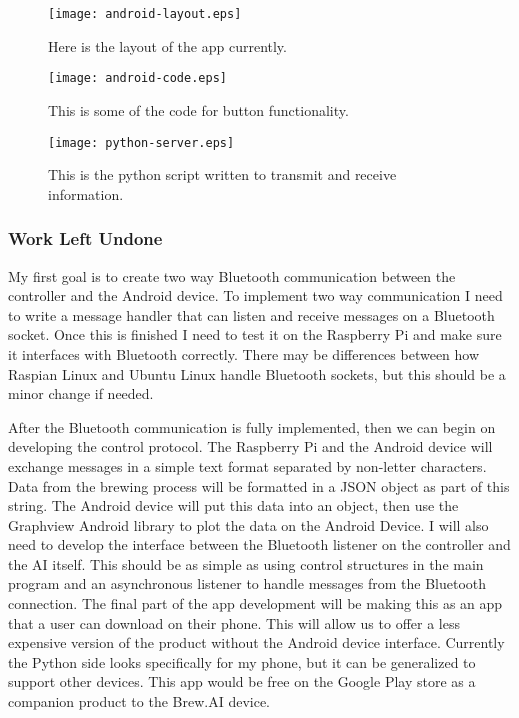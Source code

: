 \documentclass[draftclsnofoot,onecolumn,letterpaper,10pt]{IEEEtran}
\begin{document}
\newpage
\vfill

\begin{figure}
\label{fig:layout}
\caption{Here is the layout of the app currently.}
\texttt{[image: android-layout.eps]}
\end{figure}


\begin{figure}
\label{fig:code}
\caption{This is some of the code for button functionality.}
\texttt{[image: android-code.eps]}
\end{figure}


\begin{figure}
\label{fig:python}
\caption{This is the python script written to transmit and receive information.}
\texttt{[image: python-server.eps]}
\end{figure}

\vfill
\clearpage
\subsubsection{Work Left Undone}
My first goal is to create two way Bluetooth communication between the controller and the Android device.
To implement two way communication I need to write a message handler that can listen and receive messages on a Bluetooth socket.
Once this is finished I need to test it on the Raspberry Pi and make sure it interfaces with Bluetooth correctly.
There may be differences between how Raspian Linux and Ubuntu Linux handle Bluetooth sockets, but this should be
a minor change if needed.


After the Bluetooth communication is fully implemented, then we can begin on developing the control protocol.
The Raspberry Pi and the Android device will exchange messages in a simple text format separated by non-letter characters.
Data from the brewing process will be formatted in a JSON object as part of this string.
The Android device will put this data into an object, then use the Graphview Android library to plot the data on the Android Device.
I will also need to develop the interface between the Bluetooth listener on the controller and the AI itself.
This should be as simple as using control structures in the main program and an asynchronous listener to handle messages from the Bluetooth connection.
The final part of the app development will be making this as an app that a user can download on their phone.
This will allow us to offer a less expensive version of the product without the Android device interface.
Currently the Python side looks specifically for my phone, but it can be generalized to support other devices.
This app would be free on the Google Play store as a companion product to the Brew.AI device.
\end{document}
